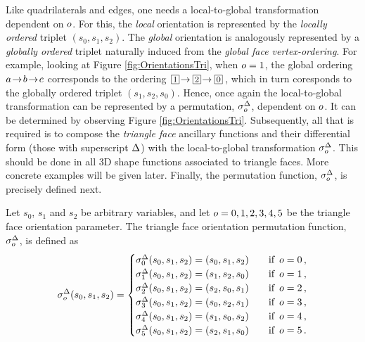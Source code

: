 Like quadrilaterals and edges, one needs a local-to-global transformation dependent on $o$.
For this, the \textit{local} orientation is represented by the \textit{locally ordered} triplet $(s_0,s_1,s_2)$.
The \textit{global} orientation is analogously represented by a \textit{globally ordered} triplet naturally induced from the \textit{global face vertex-ordering}.
For example, looking at Figure \ref{fig:OrientationsTri}, when $o=1$, the global ordering $a\!\to\! b\!\to\! c$ corresponds to the ordering $\boxednum{1}\!\tto\boxednum{2}\!\tto\boxednum{0}$, which in turn coresponds to the globally ordered triplet $(s_1,s_2,s_0)$.
Hence, once again the local-to-global transformation can be represented by a permutation, $\sigma_o^\Delta$, dependent on $o$.
It can be determined by observing Figure \ref{fig:OrientationsTri}.
Subsequently, all that is required is to compose the \textit{triangle face} ancillary functions and their differential form (those with superscript $\Delta$) with the local-to-global transformation $\sigma_o^\Delta$.
This should be done in all 3D shape functions associated to triangle faces.
More concrete examples will be given later.
Finally, the permutation function, $\sigma_o^\Delta$, is precisely defined next.

\begin{definition*}
Let $s_0$, $s_1$ and $s_2$ be arbitrary variables, and let $o=0,1,2,3,4,5$ be the triangle face orientation parameter. 
The triangle face orientation permutation function, $\sigma_o^\Delta$, is defined as
\begin{equation}
	\sigma_o^\Delta(s_0,s_1,s_2)=\begin{cases}
		\sigma_0^\Delta(s_0,s_1,s_2)=(s_0,s_1,s_2)&\quad\text{if  }\,o=0\,,\\
		\sigma_1^\Delta(s_0,s_1,s_2)=(s_1,s_2,s_0)&\quad\text{if  }\,o=1\,,\\
		\sigma_2^\Delta(s_0,s_1,s_2)=(s_2,s_0,s_1)&\quad\text{if  }\,o=2\,,\\
		\sigma_3^\Delta(s_0,s_1,s_2)=(s_0,s_2,s_1)&\quad\text{if  }\,o=3\,,\\
		\sigma_4^\Delta(s_0,s_1,s_2)=(s_1,s_0,s_2)&\quad\text{if  }\,o=4\,,\\
		\sigma_5^\Delta(s_0,s_1,s_2)=(s_2,s_1,s_0)&\quad\text{if  }\,o=5\,.\end{cases}\label{eq:orientTriFace}
\end{equation}
\end{definition*}

